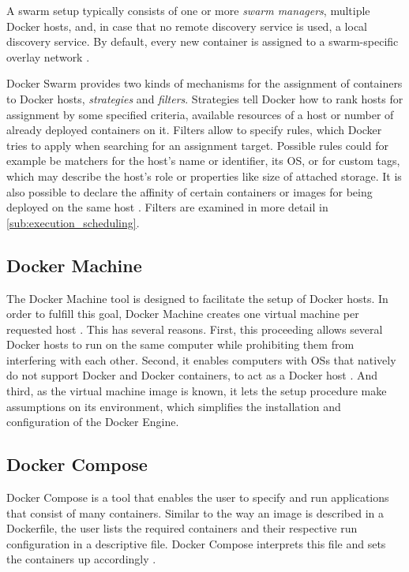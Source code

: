     A swarm setup typically consists of one or more \emph{swarm managers}, multiple Docker hosts, and, in case that no remote discovery service is used, a local discovery service. By default, every new container is assigned to a swarm-specific overlay network \cite{Docker2016Docker}.

    Docker Swarm provides two kinds of mechanisms for the assignment of containers to Docker hosts, \emph{strategies} and \emph{filters}. Strategies tell Docker how to rank hosts for assignment by some specified criteria, \eg available resources of a host or number of already deployed containers on it.
    Filters allow to specify rules, which Docker tries to apply when searching for an assignment target. Possible rules could for example be matchers for the host's name or identifier, its \ac{OS}, or for custom tags, which may describe the host's role or properties like size of attached storage. It is also possible to declare the affinity of certain containers or images for being deployed on the same host \cite{Docker2016Docker}. Filters are examined in more detail in \ref{sub:execution_scheduling}.

  \subsection{Docker Machine} %
  \label{sub:docker_machine}
    The Docker Machine tool is designed to facilitate the setup of Docker hosts. In order to fulfill this goal, Docker Machine creates one virtual machine per requested host \cite{Docker2016Dockera,Docker2016Docker}. This has several reasons. First, this proceeding allows several Docker hosts to run on the same computer while prohibiting them from interfering with each other. Second, it enables computers with \acp{OS} that natively do not support Docker and Docker containers, to act as a Docker host \cite{Docker2016Docker}. And third, as the virtual machine image is known, it lets the setup procedure make assumptions on its environment, which simplifies the installation and configuration of the Docker Engine.

  \subsection{Docker Compose} %
  \label{sub:docker_compose}
    Docker Compose is a tool that enables the user to specify and run applications that consist of many containers. Similar to the way an image is described in a Dockerfile, the user lists the required containers and their respective run configuration in a descriptive file. Docker Compose interprets this file and sets the containers up accordingly \cite{Docker2016Dockera}.

